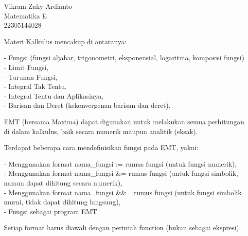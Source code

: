 \documentclass{article}
\begin{document}
\begin{eulernotebook}
\begin{eulercomment}
Vikram Zaky Ardianto\\
Matematika E\\
22305144028\\
\begin{eulercomment}
\begin{eulercomment}
Materi Kalkulus mencakup di antaranya:

- Fungsi (fungsi aljabar, trigonometri, eksponensial, logaritma,
komposisi fungsi)\\
- Limit Fungsi,\\
- Turunan Fungsi,\\
- Integral Tak Tentu,\\
- Integral Tentu dan Aplikasinya,\\
- Barisan dan Deret (kekonvergenan barisan dan deret).

EMT (bersama Maxima) dapat digunakan untuk melakukan semua perhitungan
di dalam kalkulus, baik secara numerik maupun analitik (eksak).

\end{eulercomment}
\begin{eulercomment}
Terdapat beberapa cara mendefinisikan fungsi pada EMT, yakni:

- Menggunakan format nama\_fungsi := rumus fungsi (untuk fungsi
numerik),\\
- Menggunakan format nama\_fungsi \&= rumus fungsi (untuk fungsi
simbolik, namun dapat dihitung secara numerik),\\
- Menggunakan format nama\_fungsi \&\&= rumus fungsi (untuk fungsi
simbolik murni, tidak dapat dihitung langsung),\\
- Fungsi sebagai program EMT.

Setiap format harus diawali dengan perintah function (bukan sebagai
ekspresi).


\end{eulercomment}
\end{eulercomment}
\end{eulercomment}
\end{eulernotebook}
\end{document}

